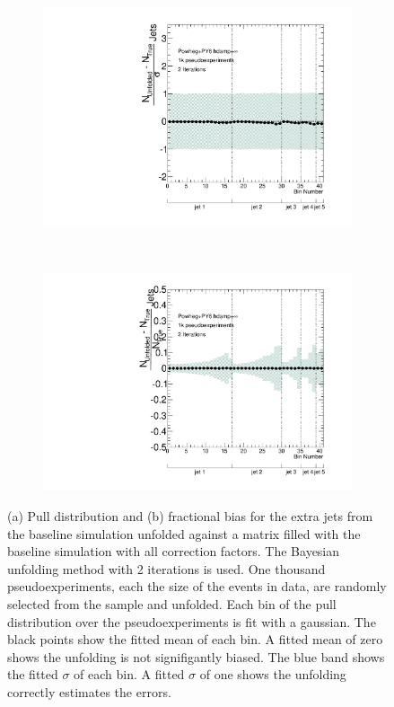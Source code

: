 \begin{figure}
\begin{subfigure}[]{0.45\textwidth}
\includegraphics[width=\textwidth]{fig/Stress/117050atlfast/Pull2Iterations.pdf}
\end{subfigure}
~
\begin{subfigure}[]{0.45\textwidth}
\includegraphics[width=\textwidth]{fig/Stress/117050atlfast/FracBias2Iterations.pdf}
\end{subfigure}
\caption{(a) Pull distribution and (b) fractional bias for the extra jets from the baseline \ttbar simulation unfolded against a matrix filled with the baseline \ttbar simulation with all correction factors. The Bayesian unfolding method with 2 iterations is used. One thousand pseudoexperiments, each the size of the events in data, are randomly selected from the sample and unfolded. Each bin of the pull distribution over the pseudoexperiments is fit with a gaussian. The black points show the fitted mean of each bin. A fitted mean of zero shows the unfolding is not signifigantly biased. The blue band shows the fitted $\sigma$ of each bin. A fitted $\sigma$ of one shows the unfolding correctly estimates the errors.}
\label{fig:UnfoldPull}
\end{figure}

